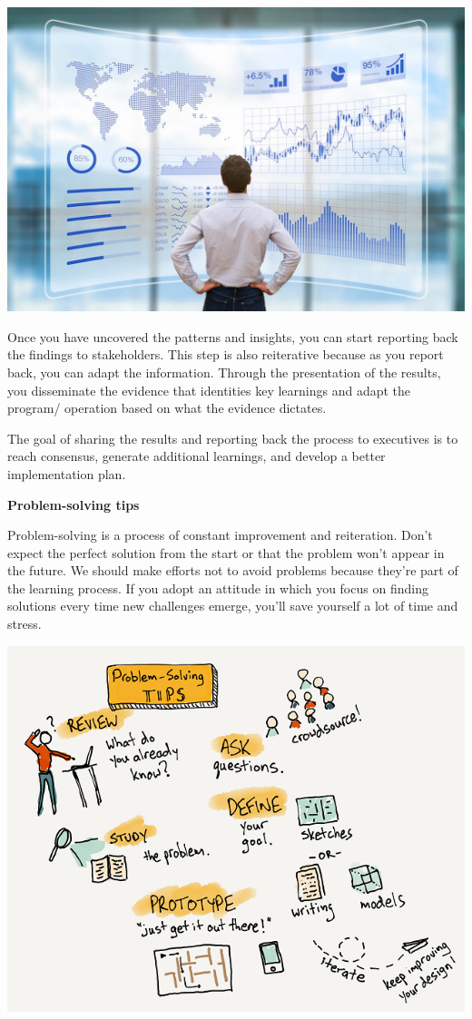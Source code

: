 \documentclass[openany]{book}
\begin{document}
\includegraphics{fig/data-analysis.jpg}

Once you have uncovered the patterns and insights, you can start reporting back the findings to stakeholders. This step is also reiterative because as you report back, you can adapt the information. Through the presentation of the results, you disseminate the evidence that identities key learnings and adapt the program/ operation based on what the evidence dictates.

The goal of sharing the results and reporting back the process to executives is to reach consensus, generate additional learnings, and develop a better implementation plan.

\textbf{Problem-solving tips}

Problem-solving is a process of constant improvement and reiteration. Don't expect the perfect solution from the start or that the problem won't appear in the future. We should make efforts not to avoid problems because they're part of the learning process. If you adopt an attitude in which you focus on finding solutions every time new challenges emerge, you'll save yourself a lot of time and stress.

\includegraphics{fig/tips.png}
\end{document}
